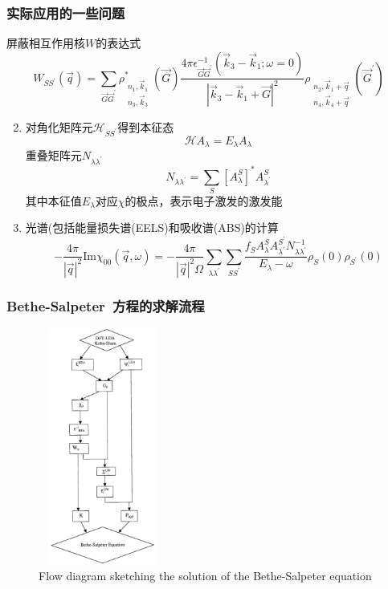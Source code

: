 \documentclass[cjk,slidestop,compress,mathserif,blue]{beamer}
\begin{document}
\frame
{
	\frametitle{实际应用的一些问题}
	屏蔽相互作用核$W$的表达式
	\begin{displaymath}
		W_{SS^{\prime}}(\vec q)=\sum_{\vec G\vec G^{\prime}}\rho_{\substack{n_1,\vec k_1\\n_3,\vec k_3}}^{\ast}(\vec G)\frac{4\pi\epsilon_{\vec G\vec G^{\prime}}^{-1}(\vec k_3-\vec k_1;\omega=0)}{|\vec k_3-\vec k_1+\vec G|^2}\rho_{\substack{n_2,\vec k_1+\vec q\\n_4,\vec k_4+\vec q}}(\vec G^{\prime})
	\end{displaymath}
	\begin{enumerate}
			\setcounter{enumi}{1}
		\item 对角化矩阵元$\mathcal{H}_{SS^{\prime}}$得到本征态
			\begin{displaymath}
				\mathcal{H}A_{\lambda}=E_{\lambda}A_{\lambda}
			\end{displaymath}
			重叠矩阵元$N_{\lambda\lambda^{\prime}}$
			\begin{displaymath}
				N_{\lambda\lambda^{\prime}}=\sum_S[A_{\lambda}^S]^{\ast}A_{\lambda^{\prime}}^S
			\end{displaymath}
			其中本征值$E_{\lambda}$对应$\chi$的极点，表示电子激发的激发能
		\item 光谱(包括能量损失谱(\textrm{EELS})和吸收谱(\textrm{ABS})的计算
			\begin{displaymath}
				-\frac{4\pi}{|\vec q|^2}\mathrm{Im}\chi_{00}(\vec q,\omega)=-\frac{4\pi}{|\vec q|^2\Omega}\sum_{\lambda\lambda^{\prime}}\sum_{SS^{\prime}}\frac{f_SA_{\lambda}^SA_{\lambda^{\prime}}^{S^{\prime}}N_{\lambda\lambda^{\prime}}^{-1}}{E_{\lambda}-\omega}\rho_S(0)\rho_{S^{\prime}}(0)
			\end{displaymath}
	\end{enumerate}
}

\frame
{
	\frametitle{\textrm{Bethe-Salpeter~}方程的求解流程}
\begin{figure}[h!]
\centering
\vspace*{-0.26in}
\includegraphics[height=3.07in,width=1.65in,viewport=0 0 380 850,clip]{Figures/BSE_flow.png}
\caption{\small \textrm{Flow diagram sketching the solution of the Bethe-Salpeter equation}}%
\label{BS_equation-1}
\end{figure} 
}
\end{document}
